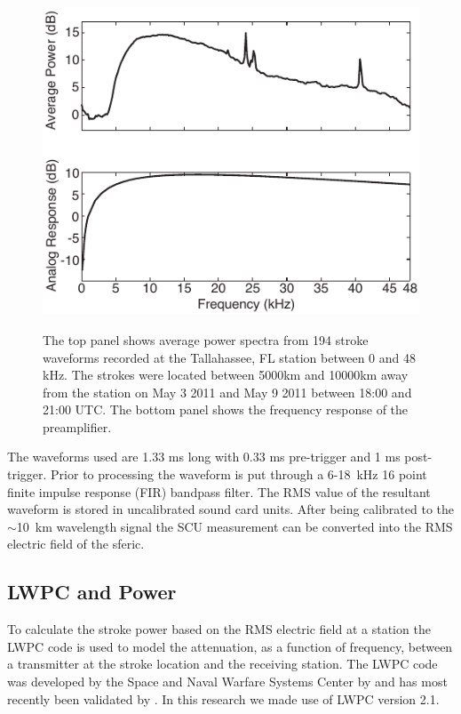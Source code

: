 \begin{figure}[ht!]
\centering
\includegraphics[scale=1]{energy/Figures/PPS_Spectra.pdf}\\
\caption{The top panel shows average power spectra from 194 stroke waveforms recorded at the Tallahassee, FL station between 0 and 48 kHz. The strokes were located between 5000km and 10000km away from the  station on May 3 2011 and May 9 2011 between 18:00 and 21:00 UTC. The bottom panel shows the frequency response of the preamplifier.}
\label{energy:fig:average_spectra}
\end{figure}

The waveforms used are 1.33 ms long with 0.33 ms pre-trigger and 1 ms post-trigger.
Prior to processing the waveform is put through a 6-18~kHz 16 point finite impulse response (FIR) bandpass filter.
The RMS value of the resultant waveform is stored in uncalibrated sound card units.
After being calibrated to the $\sim$10~km wavelength signal the SCU measurement can be converted into the RMS electric field of the sferic. 

\subsection{LWPC and Power}

To calculate the stroke power based on the RMS electric field at a station the LWPC code is used to model the attenuation, as a function of frequency, between a transmitter at the stroke location and the receiving station.
The LWPC code was developed by the Space and Naval Warfare Systems Center by \citet{Ferguson1998} and has most recently been validated by \citet{Thomson2011}.
In this research we made use of LWPC version 2.1.

